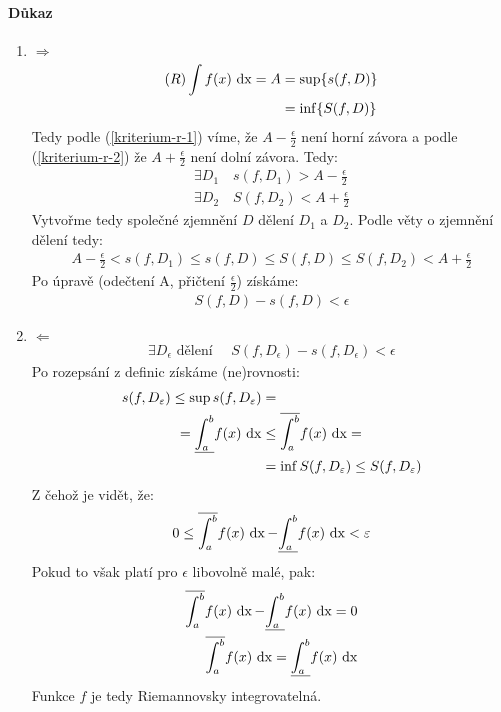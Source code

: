\documentclass[a4paper,10pt]{article}
\begin{document}
\paragraph{Důkaz}
\begin{enumerate}
	\item  $\Rightarrow$ 
		\begin{align}
			(R) \int f(x) \operatorname*{\,dx} = A
			&= \sup\{s(f,D) \} \label{kriterium-r-1}\\
			&= \inf\{S(f,D)\} \label{kriterium-r-2}
		\end{align}
		Tedy podle (\ref{kriterium-r-1}) víme, že $A - \frac{\epsilon}{2}$ není
		horní závora a podle (\ref{kriterium-r-2}) že $A+\frac{\epsilon}{2}$ není
		dolní závora. Tedy:
		\begin{align}
			\exists D_1 \quad s(f, D_1) > A - \frac{\epsilon}{2}
			\label{kriterium-r-d1} \\
			\exists D_2 \quad S(f, D_2) < A + \frac{\epsilon}{2}
			\label{kriterium-r-d2}
		\end{align}
		Vytvořme tedy společné zjemnění $D$ dělení $D_1$ a $D_2$. Podle věty o zjemnění
		dělení tedy:
		\begin{align}
			A-\frac{\epsilon}{2} < s(f, D_1) \le s(f, D) \le S(f,D) \le S(f,
			D_2) < A+ \frac{\epsilon}{2}
		\end{align}
		Po úpravě (odečtení A, přičtení $\frac{\epsilon}{2}$) získáme:
		\begin{align}
			S(f, D) - s(f,D) < \epsilon
		\end{align} 
	\item  $\Leftarrow$ 
		\begin{align}
			\exists D_\epsilon \text{ dělení } \quad S(f, D_\epsilon) -
			s(f,D_\epsilon) < \epsilon
		\end{align}
		Po rozepsání z definic získáme (ne)rovnosti:
		\begin{align} 
			s(f, D_\varepsilon) \le \sup s(f,D_\varepsilon) &=\\
			= \underline{\int_a^b} f(x) \operatorname*{\,dx} &\le \overline{\int_a^b} f(x) \operatorname*{\,dx} =\\
			&= \inf S(f,D_\varepsilon) \le S(f, D_\varepsilon) 
		\end{align}
		Z čehož je vidět, že:
		\begin{align} 
			0 \le \overline{\int_a^b} f(x) \operatorname*{\,dx} -
			\underline{\int_a^b} f(x) \operatorname*{\,dx} < \varepsilon
		\end{align}
		Pokud to však platí pro $\epsilon$ libovolně malé, pak:
		\begin{align}
			\overline{\int_a^b} f(x) \operatorname*{\,dx} - \underline{\int_a^b} f(x) \operatorname*{\,dx} = 0\\
			\overline{\int_a^b} f(x) \operatorname*{\,dx} = \underline{\int_a^b} f(x) \operatorname*{\,dx}
		\end{align} 
		Funkce $f$ je tedy Riemannovsky integrovatelná.
\end{enumerate}
\end{document}
